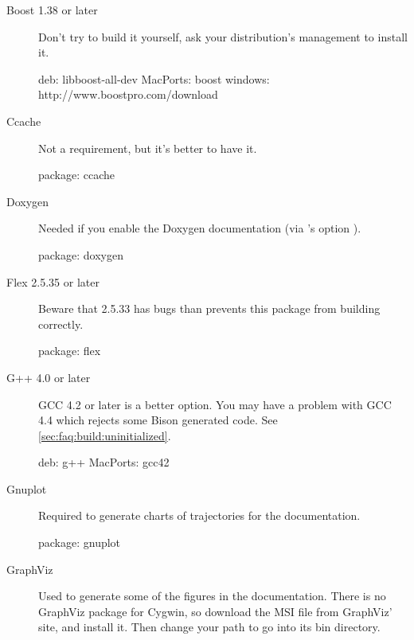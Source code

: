 \begin{description}
\item[Boost 1.38 or later] Don't try to build it yourself, ask your
  distribution's management to install it.
\begin{package}
deb: libboost-all-dev
MacPorts: boost
windows: http://www.boostpro.com/download
\end{package}

\item[Ccache]
  Not a requirement, but it's better to have it.
\begin{package}
package: ccache
\end{package}

\item[Doxygen] Needed if you enable the Doxygen documentation (via
  's option ).
\begin{package}
package: doxygen
\end{package}

\item[Flex 2.5.35 or later]
  Beware that 2.5.33 has bugs than prevents this package from building
  correctly.
\begin{package}
package: flex
\end{package}

\item[G++ 4.0 or later] GCC 4.2 or later is a better option.  You may have a
  problem with GCC 4.4 which rejects some Bison generated code.  See
  \autoref{sec:faq:build:uninitialized}.
\begin{package}
deb: g++
MacPorts: gcc42
\end{package}

\item[Gnuplot]
  Required to generate charts of trajectories for the documentation.
\begin{package}
package: gnuplot
\end{package}

\item[GraphViz] Used to generate some of the figures in the
  documentation.  There is no GraphViz package for Cygwin, so download
  the MSI file from GraphViz' site, and install it.  Then change your
  path to go into its bin directory.



\end{description}
